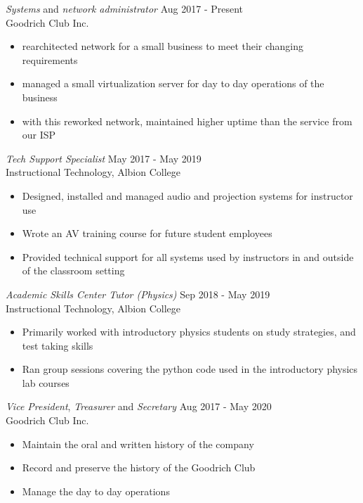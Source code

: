 \documentclass[line,mm]{res}
\begin{document}
\begin{resume}
                {\it Systems} and {\it network administrator} \hfill Aug 2017 \space - \space Present\\
                Goodrich Club Inc.
                \begin{itemize}[noitemsep,leftmargin=0.5cm]
                \item rearchitected network for a small business to meet their changing requirements
                \item managed a small virtualization server for day to day operations of the business
                \item with this reworked network, maintained higher uptime than the service from our ISP
            	\end{itemize}
            	
                {\sl Tech Support Specialist} \hfill            May 2017 \space - \space May 2019\\
                Instructional Technology, Albion College 
                \begin{itemize}[noitemsep,leftmargin=0.5cm]
                \item Designed, installed and managed audio and projection systems for instructor use
                \item Wrote an AV training course for future student employees
                \item Provided technical support for all systems used by instructors in and outside of the classroom setting
                \end{itemize}
                
                {\sl Academic Skills Center Tutor (Physics)} \hfill            Sep 2018 \space - \space May 2019\\
                Instructional Technology, Albion College 
                \begin{itemize}[noitemsep,leftmargin=0.5cm]
                \item Primarily worked with introductory physics students on study strategies, and test taking skills
                \item Ran group sessions covering the python code used in the introductory physics lab courses
                \end{itemize}
                
                {\it Vice President}, {\it Treasurer} and {\it Secretary} \hfill Aug 2017 \space - \space May 2020\\
                Goodrich Club Inc.
           		\begin{itemize}[noitemsep,leftmargin=0.5cm]
           		\item Maintain the oral and written history of the company
            	\item Record and preserve the history of the Goodrich Club
            	\item Manage the day to day operations
            	\end{itemize}
                

\end{resume}
\end{document}
